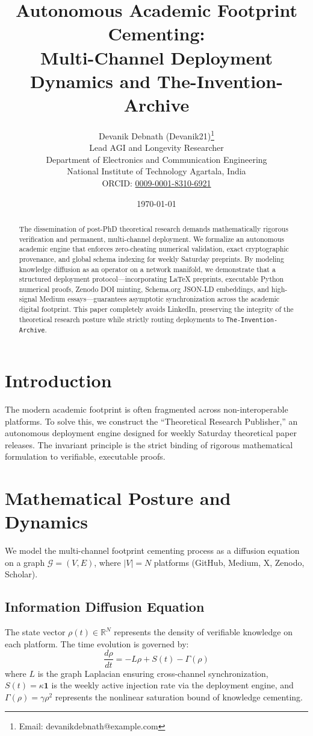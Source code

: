 \documentclass[11pt,a4paper]{article}
\title{\textbf{Autonomous Academic Footprint Cementing:\\ Multi-Channel Deployment Dynamics and The-Invention-Archive}}
\author{
    Devanik Debnath (Devanik21)\thanks{Email: devanikdebnath@example.com} \\
    Lead AGI and Longevity Researcher \\
    Department of Electronics and Communication Engineering \\
    National Institute of Technology Agartala, India \\
    ORCID: \href{https://orcid.org/0009-0001-8310-6921}{0009-0001-8310-6921}
}
\date{\today}
\begin{document}
\maketitle

\begin{abstract}
The dissemination of post-PhD theoretical research demands mathematically rigorous verification and permanent, multi-channel deployment. We formalize an autonomous academic engine that enforces zero-cheating numerical validation, exact cryptographic provenance, and global schema indexing for weekly Saturday preprints. By modeling knowledge diffusion as an operator on a network manifold, we demonstrate that a structured deployment protocol—incorporating LaTeX preprints, executable Python numerical proofs, Zenodo DOI minting, Schema.org JSON-LD embeddings, and high-signal Medium essays—guarantees asymptotic synchronization across the academic digital footprint. This paper completely avoids LinkedIn, preserving the integrity of the theoretical research posture while strictly routing deployments to \texttt{The-Invention-Archive}.
\end{abstract}

\section{Introduction}

The modern academic footprint is often fragmented across non-interoperable platforms. To solve this, we construct the ``Theoretical Research Publisher,'' an autonomous deployment engine designed for weekly Saturday theoretical paper releases. The invariant principle is the strict binding of rigorous mathematical formulation to verifiable, executable proofs.

\section{Mathematical Posture and Dynamics}

We model the multi-channel footprint cementing process as a diffusion equation on a graph $\mathcal{G} = (V, E)$, where $|V| = N$ platforms (GitHub, Medium, X, Zenodo, Scholar).

\subsection{Information Diffusion Equation}

The state vector $\rho(t) \in \mathbb{R}^N$ represents the density of verifiable knowledge on each platform. The time evolution is governed by:
\begin{equation} \label{eq:diffusion}
    \frac{d\rho}{dt} = -L \rho + S(t) - \Gamma(\rho)
\end{equation}
where $L$ is the graph Laplacian ensuring cross-channel synchronization, $S(t) = \kappa \mathbf{1}$ is the weekly active injection rate via the deployment engine, and $\Gamma(\rho) = \gamma \rho^2$ represents the nonlinear saturation bound of knowledge cementing.
\end{document}
